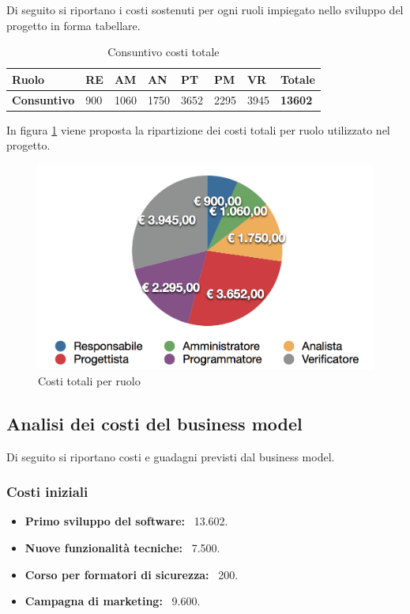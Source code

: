 Di seguito si riportano i costi sostenuti per ogni ruoli impiegato nello sviluppo del progetto in forma tabellare.

\begin{table}[H]
\caption{Consuntivo costi totale}
\label{costiTotaliConsuntivo}
\centering
\begin{tabular}{|p{3cm} | p{1cm}|p{1cm}| p{1cm}| p{1cm}| p{1cm}| p{1cm}| p{1cm}|}
\hline
\textbf{Ruolo}           & RE   &   AM  &   AN  &  PT  &  PM  &  VR  &  Totale      \\
\hline
\textbf{Consuntivo} 		& 900  &  1060 &  1750 & 3652 & 2295 & 3945 & \textbf{13602} \\
\hline
\end{tabular}
\end{table}

In figura \ref{costiTotPerRuoloCons} viene proposta la ripartizione dei costi totali per ruolo utilizzato nel progetto.

\begin{figure}[h]
\centering
\includegraphics[scale=0.25]{images/cap6/costiPerRuoloConsuntivo.png} %
\caption{Costi totali per ruolo}
\label{costiTotPerRuoloCons}
\end{figure}


\newpage

\subsection{Analisi dei costi del business model}

Di seguito si riportano costi e guadagni previsti dal business model.

\subsubsection{Costi iniziali}
\begin{itemize}
	\item \textbf{Primo sviluppo del software:} \EUR \ 13.602.
	\item \textbf{Nuove funzionalità tecniche:} \EUR \ 7.500.
	\item \textbf{Corso per formatori di sicurezza:} \EUR \ 200.
	\item \textbf{Campagna di marketing:} \EUR \ 9.600.
\end{itemize}


